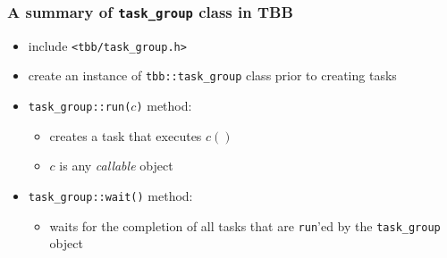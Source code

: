 \documentclass[12pt,dvipdfmx]{beamer}
\newcommand{\ao}[1]{{\color{blue}#1}}
\begin{document}
\begin{frame}[fragile]
\frametitle{A summary of \texttt{task\_group} class in TBB}

\begin{itemize}
\item include \ao{\tt <tbb/task\_group.h>}
\item create an instance of {\tt tbb::task\_group} class
  prior to creating tasks
\item \ao{\tt task\_group::run($c$)} method:
  \begin{itemize}
  \item creates a task that executes $c()$
  \item $c$ is any \ao{\em callable} object
  \end{itemize}
\item \ao{\tt task\_group::wait()} method:
  \begin{itemize}
  \item waits for the completion of all tasks
    that are {\tt run}'ed by the {\tt task\_group} object
  \end{itemize}
\end{itemize}
\end{frame}
\end{document}
